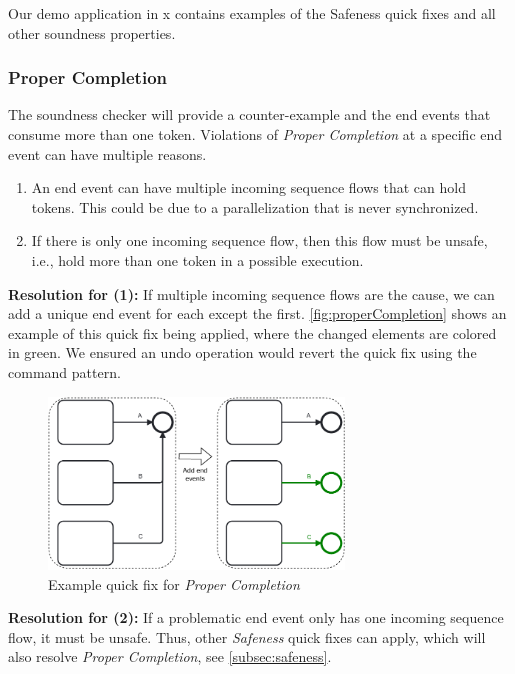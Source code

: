 \documentclass[runningheads]{llncs}
\begin{document}
Our demo application in x contains examples of the Safeness quick fixes and all other soundness properties.

\subsubsection{Proper Completion}
The soundness checker will provide a counter-example and the end events that consume more than one token.
Violations of \textit{Proper Completion} at a specific end event can have multiple reasons.

\begin{enumerate}
	\item An end event can have multiple incoming sequence flows that can hold tokens.
	This could be due to a parallelization that is never synchronized.
	\item If there is only one incoming sequence flow, then this flow must be unsafe, i.e., hold more than one token in a possible execution.
\end{enumerate}

\textbf{Resolution for (1):} If multiple incoming sequence flows are the cause, we can add a unique end event for each except the first.
\autoref{fig:properCompletion} shows an example of this quick fix being applied, where the changed elements are colored in green.
We ensured an undo operation would revert the quick fix using the command pattern.

\begin{figure}[ht]
	\centering
	\includegraphics[width=0.7\textwidth]{images/properCompletion}
	\caption{Example quick fix for \textit{Proper Completion}}
	\label{fig:properCompletion}
\end{figure}

\textbf{Resolution for (2):} If a problematic end event only has one incoming sequence flow, it must be unsafe.
Thus, other \textit{Safeness} quick fixes can apply, which will also resolve \textit{Proper Completion}, see \autoref{subsec:safeness}.
\end{document}
